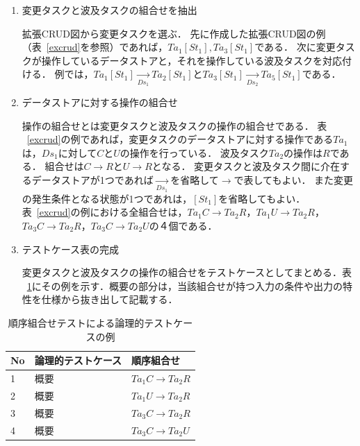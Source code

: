 \documentclass[a4paper,12pt]{jreport}
\begin{document}
\begin{enumerate}
\item 変更タスクと波及タスクの組合せを抽出

拡張CRUD図から変更タスクを選ぶ．
先に作成した拡張CRUD図の例（表~\ref{excrud}を参照）であれば，$Ta_1[St_1],Ta_3[St_1]$である．
次に変更タスクが操作しているデータストアと，それを操作している波及タスクを対応付ける．
例では，$Ta_1[St_1]  \xrightarrow[Ds_1]{} Ta_2[St_1]$と$Ta_3[St_1]  \xrightarrow[Ds_2]{}  Ta_5[St_1]$である．


\item データストアに対する操作の組合せ

操作の組合せとは変更タスクと波及タスクの操作の組合せである．
表 ~\ref{excrud}の例であれば，変更タスクのデータストアに対する操作である$Ta_1$は，$Ds_1$に対して$C$と$U$の操作を行っている．
波及タスク$Ta_2$の操作は$R$である．
組合せは$C  \rightarrow R$と$U  \rightarrow R$となる．
変更タスクと波及タスク間に介在するデータストアが1つであれば$\xrightarrow[Ds_1]{}$を省略して$\rightarrow$で表してもよい．
また変更の発生条件となる状態が1つであれは，$[St_1]$を省略してもよい．
表~\ref{excrud}の例における全組合せは，$Ta_1C \rightarrow Ta_2R$，$Ta_1U \rightarrow Ta_2R$，$Ta_3C \rightarrow Ta_2R$，$Ta_3C \rightarrow Ta_2U$の４個である．




\item テストケース表の完成

変更タスクと波及タスクの操作の組合せをテストケースとしてまとめる．表 ~\ref{TCLISTSAMPLE}にその例を示す．概要の部分は，当該組合せが持つ入力の条件や出力の特性を仕様から抜き出して記載する．


\end{enumerate}

\begin{table}[t]
  \centering
  \caption{順序組合せテストによる論理的テストケースの例}
    \begin{tabular}{l|l|l}
    No & 論理的テストケース & 順序組合せ \\
    \hline
    1 & 概要 & $Ta_1C \rightarrow Ta_2R$ \\
    \hline
    2 & 概要 & $Ta_1U \rightarrow Ta_2R$ \\
    \hline
    3 & 概要 & $Ta_3C \rightarrow Ta_2R$ \\
    \hline
    4 & 概要 & $Ta_3C \rightarrow Ta_2U$ \\
    \hline
    \end{tabular}%
\label{TCLISTSAMPLE}
\end{table}%
\end{document}
